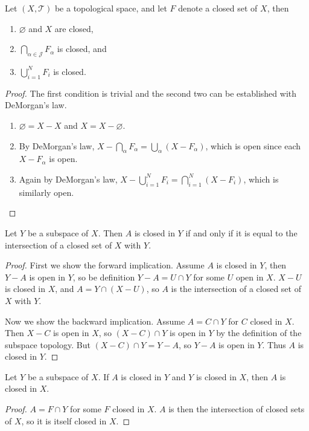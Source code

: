 \documentclass[10pt]{report}
\begin{document}
\begin{thrm}{}{}
	Let $(X, \mathcal{T})$ be a topological space, and let $F$ denote a closed set of $X$, then
	\begin{enumerate}
		\item $\varnothing$ and $X$ are closed,
		\item $\bigcap_{\alpha\in\mathcal{J}}F_\alpha$ is closed, and
		\item $\bigcup_{i=1}^N F_i$ is closed.
	\end{enumerate}
\end{thrm}
\begin{proof}
	The first condition is trivial and the second two can be established with DeMorgan's law.
	\begin{enumerate}
		\item $\varnothing=X-X$ and $X=X-\varnothing$.
		\item By DeMorgan's law, $X - \bigcap_{\alpha} F_\alpha = \bigcup_\alpha (X-F_\alpha)$, which is open since each $X-F_\alpha$ is open.
		\item Again by DeMorgan's law, $X - \bigcup_{i=1}^N F_i = \bigcap_{i=1}^N (X-F_i)$, which is similarly open.
	\end{enumerate}
\end{proof}

\begin{prop}
	\label{closed-isct}
Let $Y$ be a subspace of $X$. Then $A$ is closed in $Y$ if and only if it is equal to the intersection of a closed set of $X$ with $Y$.
\end{prop}
\begin{proof}
	First we show the forward implication. Assume $A$ is closed in $Y$, then $Y-A$ is open in $Y$, so be definition $Y-A=U \cap Y$ for some $U$ open in $X$. $X-U$ is closed in $X$, and $A = Y \cap (X-U)$, so $A$ is the intersection of a closed set of $X$ with $Y$.

	Now we show the backward implication. Assume $A = C \cap Y$ for $C$ closed in $X$. Then $X-C$ is open in $X$, so $(X-C) \cap Y$ is open in $Y$ by the definition of the subspace topology. But $(X-C) \cap Y = Y-A$, so $Y-A$ is open in $Y$. Thus $A$ is closed in $Y$.
\end{proof}

\begin{prop}
Let $Y$ be a subspace of $X$. If $A$ is closed in $Y$ and $Y$ is closed in $X$, then $A$ is closed in $X$.
\end{prop}
\begin{proof}
	$A = F \cap Y$ for some $F$ closed in $X$. $A$ is then the intersection of closed sets of $X$, so it is itself closed in $X$.
\end{proof}
\end{document}
